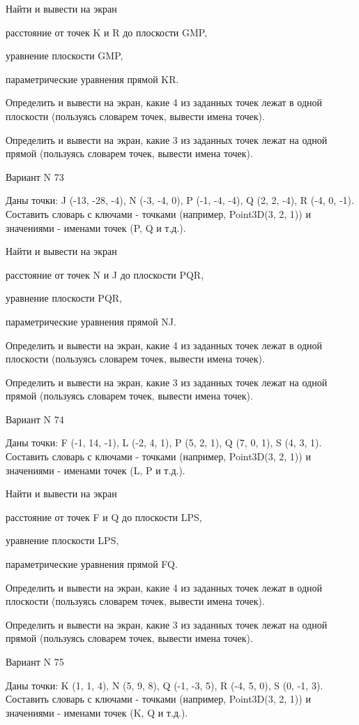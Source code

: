 \documentclass[11pt]{report}
\begin{document}
 
Найти и вывести на экран


расстояние от точек K и R до плоскости GMP,

 
уравнение плоскости GMP,

 
параметрические уравнения прямой KR.


Определить и вывести на экран, какие 4 из заданных точек лежат в одной плоскости (пользуясь словарем точек, вывести имена точек).


Определить и вывести на экран, какие 3 из заданных точек лежат на одной прямой (пользуясь словарем точек, вывести имена точек).

Вариант N 73

Даны точки: J (-13, -28, -4), N (-3, -4, 0), P (-1, -4, -4), Q (2, 2, -4), R (-4, 0, -1).
Составить словарь с ключами - точками (например, Point3D(3, 2, 1)) и значениями - именами точек (P, Q и т.д.).

 
Найти и вывести на экран


расстояние от точек N и J до плоскости PQR,

 
уравнение плоскости PQR,

 
параметрические уравнения прямой NJ.


Определить и вывести на экран, какие 4 из заданных точек лежат в одной плоскости (пользуясь словарем точек, вывести имена точек).


Определить и вывести на экран, какие 3 из заданных точек лежат на одной прямой (пользуясь словарем точек, вывести имена точек).

Вариант N 74

Даны точки: F (-1, 14, -1), L (-2, 4, 1), P (5, 2, 1), Q (7, 0, 1), S (4, 3, 1).
Составить словарь с ключами - точками (например, Point3D(3, 2, 1)) и значениями - именами точек (L, P и т.д.).

 
Найти и вывести на экран


расстояние от точек F и Q до плоскости LPS,

 
уравнение плоскости LPS,

 
параметрические уравнения прямой FQ.


Определить и вывести на экран, какие 4 из заданных точек лежат в одной плоскости (пользуясь словарем точек, вывести имена точек).


Определить и вывести на экран, какие 3 из заданных точек лежат на одной прямой (пользуясь словарем точек, вывести имена точек).

Вариант N 75

Даны точки: K (1, 1, 4), N (5, 9, 8), Q (-1, -3, 5), R (-4, 5, 0), S (0, -1, 3).
Составить словарь с ключами - точками (например, Point3D(3, 2, 1)) и значениями - именами точек (K, Q и т.д.).
\end{document}
